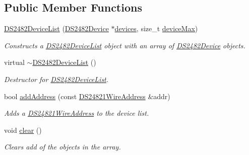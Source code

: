 \subsection*{Public Member Functions}
\begin{DoxyCompactItemize}
\item 
\mbox{\label{class_d_s2482_device_list_a86b3c60a954e4410fccc03f77e3942fd}} 
\mbox{\hyperlink{class_d_s2482_device_list_a86b3c60a954e4410fccc03f77e3942fd}{D\+S2482\+Device\+List}} (\mbox{\hyperlink{class_d_s2482_device}{D\+S2482\+Device}} $\ast$\mbox{\hyperlink{class_d_s2482_device_list_a37b73673e20f29e7544d5292617815b2}{devices}}, size\+\_\+t \mbox{\hyperlink{class_d_s2482_device_list_a88e117c26f150a9930dd5b65d5733b69}{device\+Max}})
\begin{DoxyCompactList}\small\item\em Constructs a \mbox{\hyperlink{class_d_s2482_device_list}{D\+S2482\+Device\+List}} object with an array of \mbox{\hyperlink{class_d_s2482_device}{D\+S2482\+Device}} objects. \end{DoxyCompactList}\item 
\mbox{\label{class_d_s2482_device_list_a7404b545d1704d84a0662255aa3ffe90}} 
virtual \mbox{\hyperlink{class_d_s2482_device_list_a7404b545d1704d84a0662255aa3ffe90}{$\sim$\+D\+S2482\+Device\+List}} ()
\begin{DoxyCompactList}\small\item\em Destructor for \mbox{\hyperlink{class_d_s2482_device_list}{D\+S2482\+Device\+List}}. \end{DoxyCompactList}\item 
bool \mbox{\hyperlink{class_d_s2482_device_list_a86c4f24502b9cb73376a6b102bb27f52}{add\+Address}} (const \mbox{\hyperlink{class_d_s24821_wire_address}{D\+S24821\+Wire\+Address}} \&addr)
\begin{DoxyCompactList}\small\item\em Adds a \mbox{\hyperlink{class_d_s24821_wire_address}{D\+S24821\+Wire\+Address}} to the device list. \end{DoxyCompactList}\item 
\mbox{\label{class_d_s2482_device_list_a8051df54601455c0ba9573b3089b3091}} 
void \mbox{\hyperlink{class_d_s2482_device_list_a8051df54601455c0ba9573b3089b3091}{clear}} ()
\begin{DoxyCompactList}\small\item\em Clears add of the objects in the array. \end{DoxyCompactList}\item 

\end{DoxyCompactItemize}
